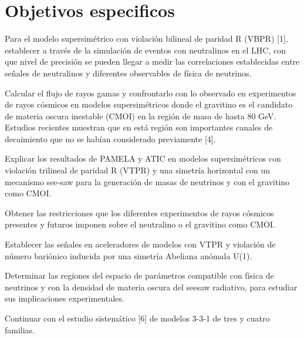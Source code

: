 \section{Objetivos especificos}

Para el modelo supersimétrico con violación bilineal de paridad R (VBPR) [1],  establecer a través de la simulación de eventos con neutralinos en el LHC, con que nivel de precisión se pueden llegar a medir las correlaciones establecidas entre señales de neutralinos y diferentes observables de física de neutrinos.

Calcular el flujo de rayos gamas y confrontarlo con lo observado en experimentos de rayos cósmicos en modelos supersimétricos donde el gravitino es el candidato de materia oscura inestable (CMOI) en la región de masa de hasta 80 GeV. Estudios recientes  muestran que en está región son importantes canales de decaimiento que no se habían considerado previamente [4]. 

Explicar los resultados de PAMELA y ATIC en modelos supersimétricos con violación trilineal de paridad R (VTPR) y una simetría horizontal con un mecanismo see-saw para la generación de masas de neutrinos y con el gravitino como CMOI.

Obtener las restricciones que los diferentes experimentos de rayos cósmicos presentes y futuros imponen sobre el neutralino o el gravitino como CMOI.

Establecer las señales en aceleradores de modelos con VTPR y violación de número bariónico inducida por una simetría Abeliana anómala U(1). 

Determinar las regiones del espacio de parámetros compatible con física de neutrinos y con la densidad de materia oscura del seesaw radiativo, para estudiar sus implicaciones experimentales.

Continuar con el estudio sistemático [6] de modelos 3-3-1 de tres y cuatro familias.

